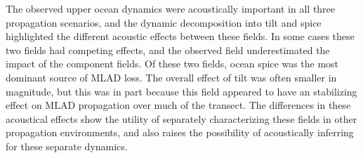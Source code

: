 \documentclass[preprint,NumberedRefs]{JASA}
\begin{document}
The observed upper ocean dynamics were acoustically important in all three propagation scenarios, and the dynamic decomposition into tilt and spice highlighted the different acoustic effects between these fields. In some cases these two fields had competing effects, and the observed field underestimated the impact of the component fields. Of these two fields, ocean spice was the most dominant source of MLAD loss. The overall effect of tilt was often smaller in magnitude, but this was in part because this field appeared to have an stabilizing effect on MLAD propagation over much of the transect. The differences in these acoustical effects show the utility of separately characterizing these fields in other propagation environments, and also raises the possibility of acoustically inferring for these separate dynamics.



\end{document}

